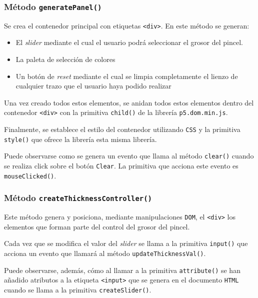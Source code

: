 \documentclass[10pt,a4paper]{report}
\begin{document}
	 \subsubsection{Método \texttt{generatePanel()}}\label{panel:generatePanel}
	 Se crea el contenedor principal con etiquetas \texttt{<div>}. En este método se generan:
	\begin{itemize}
		 \item El \textit{slider} mediante el cual el usuario podrá seleccionar el grosor del pincel.
		 \item La paleta de selección de colores
		 \item Un botón de \textit{reset} mediante el cual se limpia completamente el lienzo de cualquier trazo que el usuario haya podido realizar
	\end{itemize}	 
	Una vez creado todos estos elementos, se anidan todos estos elementos dentro del contenedor \texttt{<div>} con la primitiva \texttt{child()} de la librería \texttt{p5.dom.min.js}.
	
	Finalmente, se establece el estilo del contenedor utilizando \texttt{CSS} y la primitiva \texttt{style()} que ofrece la librería esta misma librería.
	
	Puede observarse como se genera un evento que llama al método \texttt{clear()} cuando se realiza click sobre el botón \texttt{Clear}. La primitiva que acciona este evento es \texttt{mouseClicked()}. 
	
	
	
	\subsubsection{Método \texttt{createThicknessController()}}\label{panel:thickness}
	Este método genera y posiciona, mediante manipulaciones \texttt{DOM}, el \texttt{<div>} los elementos que forman parte del control del grosor del pincel.
	
	Cada vez que se modifica el valor del \textit{slider} se llama a la primitiva \texttt{input()} que acciona un evento que llamará al método \texttt{updateThicknessVal()}.
	
	Puede observarse, además, cómo al llamar a la primitiva \texttt{attribute()} se han añadido atributos a la etiqueta \texttt{<input>} que se genera en el documento \texttt{HTML} cuando se llama a la primitiva \texttt{createSlider()}.  
	
	 
	
\end{document}
